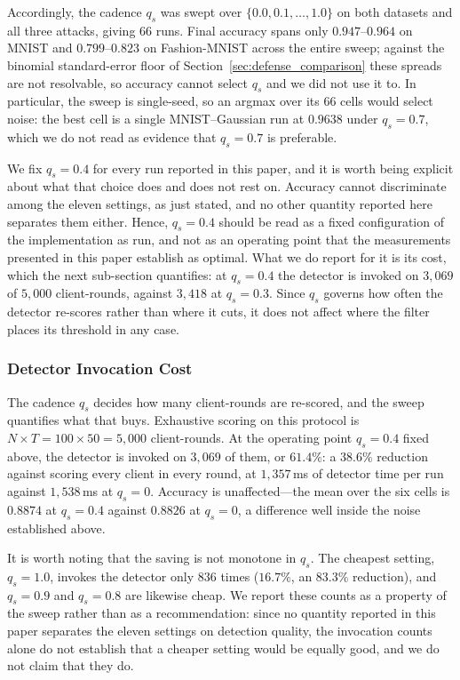 \documentclass[journal]{IEEEtran}
\begin{document}
Accordingly, the cadence $q_s$ was swept over $\{0.0, 0.1, \dots, 1.0\}$ on both datasets and all three attacks, giving $66$ runs. Final accuracy spans only $0.947$--$0.964$ on MNIST and $0.799$--$0.823$ on Fashion-MNIST across the entire sweep; against the binomial standard-error floor of Section~\ref{sec:defense_comparison} these spreads are not resolvable, so accuracy cannot select $q_s$ and we did not use it to. In particular, the sweep is single-seed, so an argmax over its $66$ cells would select noise: the best cell is a single MNIST--Gaussian run at $0.9638$ under $q_s = 0.7$, which we do not read as evidence that $q_s = 0.7$ is preferable.

We fix $q_s = 0.4$ for every run reported in this paper, and it is worth being explicit about what that choice does and does not rest on. Accuracy cannot discriminate among the eleven settings, as just stated, and no other quantity reported here separates them either. Hence, $q_s = 0.4$ should be read as a fixed configuration of the implementation as run, and not as an operating point that the measurements presented in this paper establish as optimal. What we do report for it is its cost, which the next sub-section quantifies: at $q_s = 0.4$ the detector is invoked on $3{,}069$ of $5{,}000$ client-rounds, against $3{,}418$ at $q_s = 0.3$. Since $q_s$ governs how often the detector re-scores rather than where it cuts, it does not affect where the filter places its threshold in any case.


\subsubsection{Detector Invocation Cost}
\label{sec:invocation_cost}
The cadence $q_s$ decides how many client-rounds are re-scored, and the sweep quantifies what
that buys. Exhaustive scoring on this protocol is $N \times T = 100 \times 50 = 5{,}000$
client-rounds. At the operating point $q_s = 0.4$ fixed above, the detector is invoked on
$3{,}069$ of them, or $61.4\%$: a $38.6\%$ reduction against scoring every client in every
round, at $1{,}357$\,ms of detector time per run against $1{,}538$\,ms at $q_s = 0$. Accuracy
is unaffected---the mean over the six cells is $0.8874$ at $q_s = 0.4$ against $0.8826$ at
$q_s = 0$, a difference well inside the noise established above.

It is worth noting that the saving is not monotone in $q_s$. The cheapest setting,
$q_s = 1.0$, invokes the detector only $836$ times ($16.7\%$, an $83.3\%$ reduction), and
$q_s = 0.9$ and $q_s = 0.8$ are likewise cheap. We report these counts as a property of the
sweep rather than as a recommendation: since no quantity reported in this paper separates the
eleven settings on detection quality, the invocation counts alone do not establish that a
cheaper setting would be equally good, and we do not claim that they do.
\end{document}
